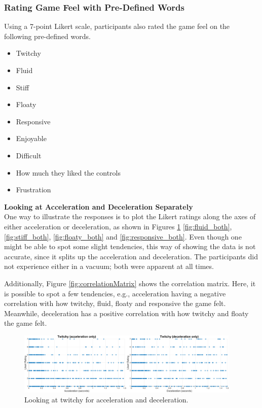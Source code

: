 
\subsubsection{Rating Game Feel with Pre-Defined Words}
Using a 7-point Likert scale, participants also rated the game feel on the following pre-defined words.
\begin{itemize}[noitemsep,nolistsep]
\item Twitchy
\item Fluid
\item Stiff
\item Floaty
\item Responsive
\item Enjoyable
\item Difficult
\item How much they liked the controls
\item Frustration
\end{itemize}

\textbf{Looking at Acceleration and Deceleration Separately}\\
One way to illustrate the responses is to plot the Likert ratings along the axes of either acceleration or deceleration, as shown in Figures \ref{fig:twitchy_both} \ref{fig:fluid_both}, \ref{fig:stiff_both}, \ref{fig:floaty_both} and \ref{fig:responsive_both}. Even though one might be able to spot some slight tendencies, this way of showing the data is not accurate, since it splits up the acceleration and deceleration. The participants did not experience either in a vacuum; both were apparent at all times.

Additionally, Figure \ref{fig:correlationMatrix} shows the correlation matrix. Here, it is possible to spot a few tendencies, e.g., acceleration having a negative correlation with how twitchy, fluid, floaty and responsive the game felt. Meanwhile, deceleration has a positive correlation with how twitchy and floaty the game felt.

\begin{figure}[htbp]
\centering
\includegraphics[width=0.95\textwidth]{Pics/Classes/twitchy_both}
\caption{Looking at twitchy for acceleration and deceleration.}
\label{fig:twitchy_both}
\end{figure}


